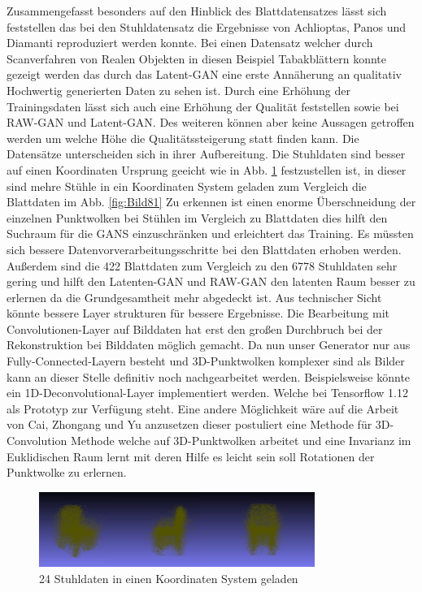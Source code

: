 \documentclass{llncs}
\begin{document}
Zusammengefasst besonders auf den Hinblick des Blattdatensatzes lässt sich feststellen das bei den Stuhldatensatz die Ergebnisse von Achlioptas, Panos und Diamanti\cite{3dgan} reproduziert werden konnte. Bei einen Datensatz welcher durch Scanverfahren von Realen Objekten in diesen Beispiel Tabakblättern konnte gezeigt werden das durch das Latent-GAN eine erste Annäherung an qualitativ Hochwertig generierten Daten zu sehen ist. Durch eine Erhöhung der Trainingsdaten lässt sich auch eine Erhöhung der Qualität feststellen sowie bei RAW-GAN und Latent-GAN. Des weiteren können aber keine Aussagen getroffen werden um welche Höhe die Qualitätssteigerung statt  finden kann. Die Datensätze unterscheiden sich in ihrer Aufbereitung. Die Stuhldaten sind besser auf einen Koordinaten Ursprung geeicht wie in Abb. \ref{fig:Bild85} festzustellen ist, in dieser sind mehre Stühle in ein Koordinaten System geladen zum Vergleich die Blattdaten im Abb. \ref{fig:Bild81} Zu erkennen ist einen enorme Überschneidung der einzelnen Punktwolken bei Stühlen im Vergleich zu Blattdaten dies hilft den Suchraum für die GANS einzuschränken und erleichtert das Training. Es müssten sich bessere Datenvorverarbeitungsschritte bei den Blattdaten erhoben werden. Außerdem sind die 422 Blattdaten zum Vergleich zu den 6778 Stuhldaten sehr gering und hilft den Latenten-GAN und RAW-GAN den latenten Raum besser zu erlernen da die Grundgesamtheit mehr abgedeckt ist. Aus technischer Sicht könnte bessere Layer strukturen für bessere Ergebnisse. Die Bearbeitung mit Convolutionen-Layer auf Bilddaten hat erst den großen Durchbruch bei der Rekonstruktion bei Bilddaten möglich gemacht\cite{imagerecon}. Da nun unser Generator nur aus Fully-Connected-Layern besteht und 3D-Punktwolken komplexer sind als Bilder kann an dieser Stelle definitiv noch nachgearbeitet werden. Beispielsweise könnte ein 1D-Deconvolutional-Layer implementiert werden. Welche bei Tensorflow 1.12 als Prototyp zur Verfügung steht. Eine andere Möglichkeit wäre auf die Arbeit von Cai, Zhongang  und Yu \cite{3d-conv} anzusetzen dieser postuliert eine Methode für 3D-Convolution Methode welche auf 3D-Punktwolken arbeitet und eine Invarianz im Euklidischen Raum lernt mit deren Hilfe es leicht sein soll Rotationen der Punktwolke zu erlernen.

\begin{figure}[htbp] 
	\centering
	\includegraphics[width=0.8\textwidth]{chair_all.png}
	\caption{24 Stuhldaten in einen Koordinaten System geladen}
	\label{fig:Bild85}
\end{figure}
\newpage
\end{document}
